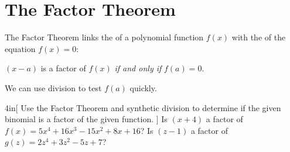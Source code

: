 \section{The Factor Theorem}

The Factor Theorem links the  of a polynomial function $f(x)$
with the  of the equation $f(x)=0$:

\begin{myCenteredBox}[width=3.75in, colback=white, ]
    \large
    $(x-a)$ is a factor of $f(x)$
    {\itshape if and only if} 
    $f(a)=0$.
\end{myCenteredBox}

We can use  division to test $f(a)$ quickly.


\begin{my2Problems}{4in}[%
    Use the Factor Theorem and synthetic division to determine if the given
    binomial is a factor of the given function.
    ]
    {
        Is $(x+4)$ a factor of \\
        $f(x) = 5x^4 +16x^3 - 15x^2 +8x + 16$?
    }
    {
        Is $(z-1)$ a factor of \\
        $g(z) = 2z^4 + 3z^2 -5z +7$?
    }
\end{my2Problems}
